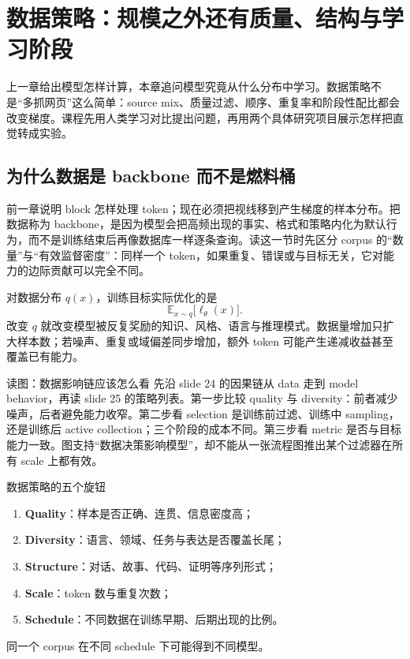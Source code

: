 \section{数据策略：规模之外还有质量、结构与学习阶段}

上一章给出模型怎样计算，本章追问模型究竟从什么分布中学习。数据策略不是“多抓网页”这么简单：source mix、质量过滤、顺序、重复率和阶段性配比都会改变梯度。课程先用人类学习对比提出问题，再用两个具体研究项目展示怎样把直觉转成实验。

\subsection{为什么数据是 backbone 而不是燃料桶}

前一章说明 block 怎样处理 token；现在必须把视线移到产生梯度的样本分布。把数据称为 backbone，是因为模型会把高频出现的事实、格式和策略内化为默认行为，而不是训练结束后再像数据库一样逐条查询。读这一节时先区分 corpus 的“数量”与“有效监督密度”：同样一个 token，如果重复、错误或与目标无关，它对能力的边际贡献可以完全不同。

对数据分布 $q(x)$，训练目标实际优化的是
\[
\mathbb{E}_{x\sim q}\big[\ell_{\theta}(x)\big].
\]
改变 $q$ 就改变模型被反复奖励的知识、风格、语言与推理模式。数据量增加只扩大样本数；若噪声、重复或域偏差同步增加，额外 token 可能产生递减收益甚至覆盖已有能力。





\begin{knowledgebox}{读图：数据影响链应该怎么看}
先沿 slide 24 的因果链从 data 走到 model behavior，再读 slide 25 的策略列表。第一步比较 quality 与 diversity：前者减少噪声，后者避免能力收窄。第二步看 selection 是训练前过滤、训练中 sampling，还是训练后 active collection；三个阶段的成本不同。第三步看 metric 是否与目标能力一致。图支持“数据决策影响模型”，却不能从一张流程图推出某个过滤器在所有 scale 上都有效。
\end{knowledgebox}

\begin{importantbox}{数据策略的五个旋钮}
\begin{enumerate}
  \item \textbf{Quality}：样本是否正确、连贯、信息密度高；
  \item \textbf{Diversity}：语言、领域、任务与表达是否覆盖长尾；
  \item \textbf{Structure}：对话、故事、代码、证明等序列形式；
  \item \textbf{Scale}：token 数与重复次数；
  \item \textbf{Schedule}：不同数据在训练早期、后期出现的比例。
\end{enumerate}
同一个 corpus 在不同 schedule 下可能得到不同模型。
\end{importantbox}


